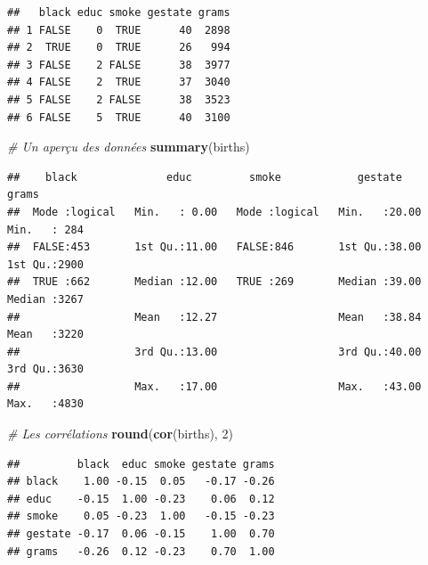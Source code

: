 \documentclass[
  11pt,
]{book}
\newenvironment{Shaded}{\begin{snugshade}}{\end{snugshade}}
\newcommand{\CommentTok}[1]{\textcolor[rgb]{0.56,0.35,0.01}{\textit{#1}}}
\newcommand{\DecValTok}[1]{\textcolor[rgb]{0.00,0.00,0.81}{#1}}
\newcommand{\KeywordTok}[1]{\textcolor[rgb]{0.13,0.29,0.53}{\textbf{#1}}}
\newcommand{\NormalTok}[1]{#1}
\numberwithin{equation}{section}
\numberwithin{countremarque}{section}
\begin{document}
\begin{lstlisting}
##   black educ smoke gestate grams
## 1 FALSE    0  TRUE      40  2898
## 2  TRUE    0  TRUE      26   994
## 3 FALSE    2 FALSE      38  3977
## 4 FALSE    2  TRUE      37  3040
## 5 FALSE    2 FALSE      38  3523
## 6 FALSE    5  TRUE      40  3100
\end{lstlisting}

\begin{Shaded}
\begin{Highlighting}[]
\CommentTok{\# Un aperçu des données}
\KeywordTok{summary}\NormalTok{(births)}
\end{Highlighting}
\end{Shaded}

\begin{lstlisting}
##    black              educ         smoke            gestate          grams     
##  Mode :logical   Min.   : 0.00   Mode :logical   Min.   :20.00   Min.   : 284  
##  FALSE:453       1st Qu.:11.00   FALSE:846       1st Qu.:38.00   1st Qu.:2900  
##  TRUE :662       Median :12.00   TRUE :269       Median :39.00   Median :3267  
##                  Mean   :12.27                   Mean   :38.84   Mean   :3220  
##                  3rd Qu.:13.00                   3rd Qu.:40.00   3rd Qu.:3630  
##                  Max.   :17.00                   Max.   :43.00   Max.   :4830
\end{lstlisting}

\begin{Shaded}
\begin{Highlighting}[]
\CommentTok{\# Les corrélations}
\KeywordTok{round}\NormalTok{(}\KeywordTok{cor}\NormalTok{(births), }\DecValTok{2}\NormalTok{)}
\end{Highlighting}
\end{Shaded}

\begin{lstlisting}
##         black  educ smoke gestate grams
## black    1.00 -0.15  0.05   -0.17 -0.26
## educ    -0.15  1.00 -0.23    0.06  0.12
## smoke    0.05 -0.23  1.00   -0.15 -0.23
## gestate -0.17  0.06 -0.15    1.00  0.70
## grams   -0.26  0.12 -0.23    0.70  1.00
\end{lstlisting}
\end{document}
